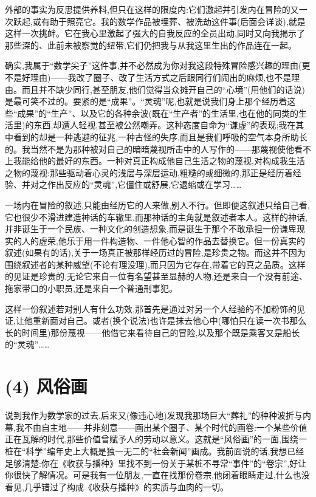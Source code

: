 外部的事实为反思提供养料,但只在这样的限度内:它们激起并引发内在冒险的又一次跃起,或有助于照亮它。我的数学作品被埋葬、被洗劫这件事(后面会详谈),就是这样一次挑衅。它在我心里激起了强大的自我反应的全员出动,同时又向我揭示了那些深的、此前未被察觉的纽带,它们仍把我与从我这里生出的作品连在一起。

 确实,我属于“数学尖子”这件事,并不必然成为你对我这段特殊冒险感兴趣的理由(更不是好理由)——我改了圈子、改了生活方式之后跟同行们闹出的麻烦,也不是理由。而且并不缺少同行,甚至朋友,他们觉得当众摊开自己的“心境”(用他们的话说)是最可笑不过的。要紧的是“成果”。“灵魂”呢,也就是说我们身上那个经历着这些“成果”的“生产”、以及它的各种余波(既在“生产者”的生活里,也在他的同类的生活里)的东西,却遭人轻视,甚至被公然嘲弄。这种态度自命为“谦虚”的表现;我在其中看到的却是一种逃避的征兆,一种古怪的失序,而且是我们呼吸的空气本身所助长的。我当然不是为那种被对自己的暗暗蔑视所击中的人写作的——那蔑视使他看不上我能给他的最好的东西。一种对真正构成他自己生活之物的蔑视,对构成我生活之物的蔑视:那些驱动着心灵的浅层与深层运动,粗糙的或细微的,那正是经历着经验、并对之作出反应的“灵魂”,它僵住或舒展,它退缩或在学习……

一场内在冒险的叙述,只能由经历它的人来做,别人不行。但即便这叙述只给自己看,它也很少不滑进建造神话的车辙里,而那神话的主角就是叙述者本人。这样的神话,并非诞生于一个民族、一种文化的创造想象,而是诞生于那个不敢承担一份谦卑现实的人的虚荣,他乐于用一件构造物、一件他心智的作品去替换它。但一份真实的叙述(如果有的话),关于一场真正被那样经历过的冒险,是珍贵之物。而这并不因为围绕叙述者的某种威望(不论有理没理),而只因为它存在,带着它的真之品质。这样的见证是珍贵的,无论它来自一位有名望甚至显赫的人物,还是来自一个没有前途、拖家带口的小职员,还是来自一个普通刑事犯。

这样一份叙述若对别人有什么功效,那首先是通过对另一个人经验的不加粉饰的见证,让他重新面对自己。或者(换个说法)也许是抹去他心中(哪怕只在读一次书那么长的时间里)那份蔑视——他借它来看待自己的冒险,以及那个既是乘客又是船长的“灵魂”……

\section{(4) 风俗画}

说到我作为数学家的过去,后来又(像违心地)发现我那场巨大“葬礼”的种种波折与内幕,我不由自主地——并非刻意——画出某个圈子、某个时代的画卷:一个某些价值正在瓦解的时代,那些价值曾赋予人的劳动以意义。这就是“风俗画”的一面,围绕一桩在“科学”编年史上大概是独一无二的“社会新闻”画成。我前面说的话,我想已经足够清楚:你在《收获与播种》里找不到一份关于某桩不寻常“事件”的“卷宗”,好让你很快了解情况。可是我有一位朋友,一直在找那份卷宗,他闭着眼睛走过,什么也没看见,几乎错过了构成《收获与播种》的实质与血肉的一切。

